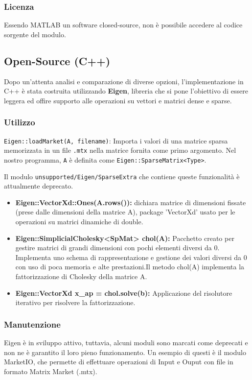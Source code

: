 \documentclass[11pt,italian]{article}
\begin{document}
\subsubsection*{Licenza}
Essendo MATLAB un software closed-source, non è possibile accedere al codice sorgente del modulo.

\subsection{Open-Source (C++)}
Dopo un'attenta analisi e comparazione di diverse opzioni, l'implementazione in C++ è stata costruita utilizzando \textbf{Eigen},  libreria che si pone l'obiettivo di essere leggera ed offire supporto alle operazioni su vettori e matrici dense e sparse.

\subsubsection*{Utilizzo}
\lstinline{Eigen::loadMarket(A, filename)}: Importa i valori di una matrice sparsa memorizzata in un file \lstinline{.mtx} nella matrice fornita come primo argomento. Nel nostro programma, \lstinline{A} è definita come \lstinline{Eigen::SparseMatrix<Type>}.

Il modulo \lstinline{unsupported/Eigen/SparseExtra} che contiene queste funzionalità è attualmente deprecato.

\begin{itemize}
\item \textbf{Eigen::VectorXd::Ones(A.rows()):} dichiara matrice di dimensioni fissate (prese dalle dimensioni della matrice A), package 'VectorXd' usato per le operazioni su matrici dinamiche di double.
	\item \textbf{Eigen::SimplicialCholesky<SpMat> chol(A):} Pacchetto creato per gestire matrici di grandi dimensioni con pochi elementi diversi da 0. Implementa uno schema di rappresentazione e gestione dei valori diversi da 0 con uso di poca memoria e alte prestazioni.\newline Il metodo chol(A) implementa la fattorizzazione di Cholesky della matrice A.
	\item \textbf{Eigen::VectorXd x\_ap = chol.solve(b):} Applicazione del risolutore iterativo per risolvere la fattorizzazione.
\end{itemize}

\subsubsection{Manutenzione}
Eigen è in sviluppo attivo, tuttavia, alcuni moduli sono marcati come deprecati e non ne è garantito il loro pieno funzionamento. Un esempio di questi è il modulo MarketIO, che permette di effettuare operazioni di Input e Ouput con file in formato Matrix Market (.mtx).
\end{document}
